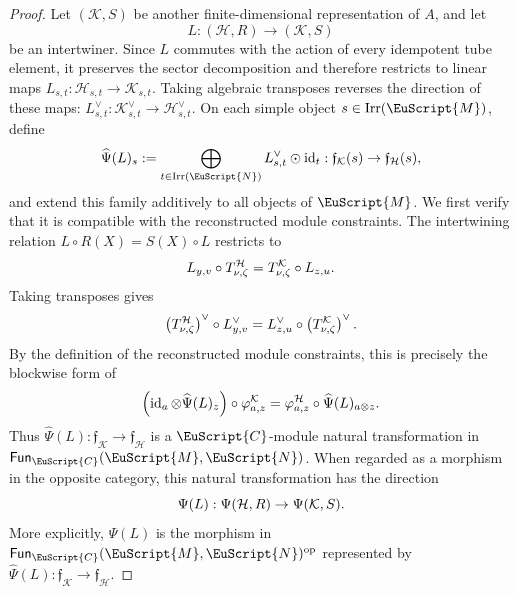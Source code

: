 \documentclass[a4paper,11pt]{article}
\theoremstyle{definition}
\theoremstyle{remark}
\newcommand\eC           {\EuScript{C}}
\newcommand\eM          {\EuScript{M}}
\newcommand\eN         {\EuScript{N}}
\newcommand{\id}{\operatorname{id}}
\newcommand{\Irr}{\operatorname{Irr}}
\newcommand{\Fun}{\mathsf{Fun}}
\begin{document}
\begin{proof}
Let $(\mathcal K,S)$ be another finite-dimensional representation of $A$, and let
\begin{equation*}
    L:(\mathcal H,R)\to(\mathcal K,S)
\end{equation*}
be an intertwiner. Since $L$ commutes with the action of every idempotent tube element, it preserves the sector decomposition and therefore restricts to linear maps $L_{s,t}: \mathcal H_{s,t}\to\mathcal K_{s,t}$. Taking algebraic transposes reverses the direction of these maps: $L_{s,t}^{\vee}: \mathcal K_{s,t}^{\vee}\to\mathcal H_{s,t}^{\vee}$. On each simple object $s\in\Irr(\eM)$, define
\begin{equation}
    \notag
    \widehat{\Psi}(L)_s := \bigoplus_{t\in\Irr(\eN)} L_{s,t}^{\vee}\odot\id_t: \mathfrak f_{\mathcal K}(s) \to \mathfrak f_{\mathcal H}(s),
\end{equation}
and extend this family additively to all objects of $\eM$. We first verify that it is compatible with the reconstructed module constraints. The intertwining relation $L\circ R(X)=S(X)\circ L$ restricts to
\begin{equation}
    \notag
    L_{y,v}\circ T^{\mathcal H}_{\nu,\zeta} = T^{\mathcal K}_{\nu,\zeta}\circ L_{z,u}.
\end{equation}
Taking transposes gives
\begin{equation}
    \notag
    \left(T^{\mathcal H}_{\nu,\zeta}\right)^{\vee} \circ L_{y,v}^{\vee} = L_{z,u}^{\vee} \circ \left(T^{\mathcal K}_{\nu,\zeta}\right)^{\vee}.
\end{equation}
By the definition of the reconstructed module constraints, this is precisely the blockwise form of
\begin{equation}
    \notag
    \left( \id_a \otimes\widehat{\Psi}(L)_z \right)\circ \varphi^{\mathcal K}_{a,z} = \varphi^{\mathcal H}_{a,z}\circ \widehat{\Psi}(L)_{a\otimes z}.
\end{equation}
Thus $\widehat{\Psi}(L):\mathfrak f_{\mathcal K}\to\mathfrak f_{\mathcal H}$ is a $\eC$-module natural transformation in $\Fun_{\eC}(\eM,\eN)$. When regarded as a morphism in the opposite category, this natural transformation has the direction
\begin{equation}
    \notag
    \Psi(L):\Psi(\mathcal H,R) \to \Psi(\mathcal K,S).
\end{equation}
More explicitly, $\Psi(L)$ is the morphism in $\Fun_{\eC}(\eM,\eN)^{\rm op}$ represented by $\widehat{\Psi}(L):
\mathfrak f_{\mathcal K}\to\mathfrak f_{\mathcal H}$.


\end{proof}
\end{document}
